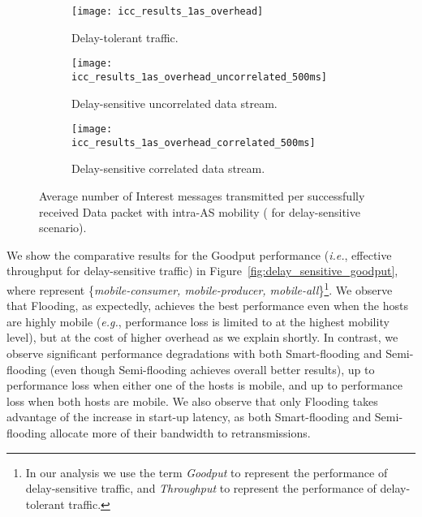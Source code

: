 \documentclass[conference]{IEEEtran}
\begin{document}
\begin{figure*}
        \centering
        \hspace{-0.15in}
          \begin{subfigure}[b]{0.3\textwidth}\centering
                \texttt{[image: icc\_results\_1as\_overhead]}\\
                \caption{Delay-tolerant traffic.}
                \label{DataOverhead}
        \end{subfigure}
        \hspace{0.05in}
        \begin{subfigure}[b]{0.3\textwidth}\centering
               \texttt{[image: icc\_results\_1as\_overhead\_uncorrelated\_500ms]}\\
               \caption{Delay-sensitive uncorrelated data stream.}
               \label{UncorrelatedOverhead}
        \end{subfigure}
        \hspace{0.05in}
        \begin{subfigure}[b]{0.3\textwidth}\centering
                \texttt{[image: icc\_results\_1as\_overhead\_correlated\_500ms]}\\
                \caption{Delay-sensitive correlated data stream.}
                \label{CorrelatedOverhead}
        \end{subfigure}
        \caption{Average number of Interest messages transmitted per successfully received Data packet with intra-AS mobility ( for delay-sensitive scenario).}\label{fig:overhead}
\end{figure*}

We show the comparative results for the Goodput performance (\emph{i.e.}, effective throughput for delay-sensitive traffic) in Figure~\ref{fig:delay_sensitive_goodput}, where  represent \{\emph{mobile-consumer, mobile-producer, mobile-all}\}\footnote{In our analysis we use the term \emph{Goodput} to represent the performance of delay-sensitive traffic, and \emph{Throughput} to represent the performance of delay-tolerant traffic.}. We observe that Flooding, as expectedly, achieves the best performance even when the hosts are highly mobile (\emph{e.g.}, performance loss is limited to  at the highest mobility level), but at the cost of higher overhead as we explain shortly. In contrast, we observe significant performance degradations with both Smart-flooding and Semi-flooding (even though Semi-flooding achieves overall better results), up to  performance loss when either one of the hosts is mobile, and up to  performance loss when both hosts are mobile. We also observe that only Flooding takes advantage of the increase in start-up latency, as both Smart-flooding and Semi-flooding allocate more of their bandwidth to retransmissions.
\end{document}
